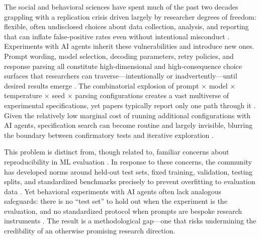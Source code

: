 \documentclass{article}
\theoremstyle{plain}
\theoremstyle{definition}
\theoremstyle{remark}
\begin{document}
The social and behavioral sciences have spent much of the past two decades grappling with a replication crisis driven largely by researcher degrees of freedom: flexible, often undisclosed choices about data collection, analysis, and reporting that can inflate false-positive rates even without intentional misconduct \citep{simmons2011falsepositive,gelman2013forkingpaths,opensciencecollaboration2015reproducibility,steegen2016multiverse}. Experiments with AI agents inherit these vulnerabilities and introduce new ones. Prompt wording, model selection, decoding parameters, retry policies, and response parsing all constitute high-dimensional and high-consequence choice surfaces that researchers can traverse—intentionally or inadvertently—until desired results emerge \citep{ma2025promptstability,herrera-poyatos2025uncertaintyvariability,oh2025moralrobustness, sclar2024quantifying}. The combinatorial explosion of prompt $\times$ model $\times$ temperature $\times$ seed $\times$ parsing configurations creates a vast multiverse of experimental specifications, yet papers typically report only one path through it \citep{steegen2016multiverse,gelman2013forkingpaths}. Given the relatively low marginal cost of running additional configurations with AI agents, specification search can become routine and largely invisible, blurring the boundary between confirmatory tests and iterative exploration \citep{simmons2011falsepositive,gelman2013forkingpaths}.

This problem is distinct from, though related to, familiar concerns about reproducibility in ML evaluation \citep{hutson2018artificial, henderson2018deep, gundersen2018state}. In response to these concerns, the community has developed norms around held-out test sets, fixed training, validation, testing splits, and standardized benchmarks precisely to prevent overfitting to evaluation data \citep{dwork2015reusableholdout,liang2022helm, pineau2021reproducibility, kapoor2023leakage}. Yet behavioral experiments with AI agents often lack analogous safeguards: there is no ``test set'' to hold out when the experiment is the evaluation, and no standardized protocol when prompts are bespoke research instruments \citep{horton2023large,dominguez-olmedo2024questioning,aher2023using}. The result is a methodological gap—one that risks undermining the credibility of an otherwise promising research direction.
\end{document}
